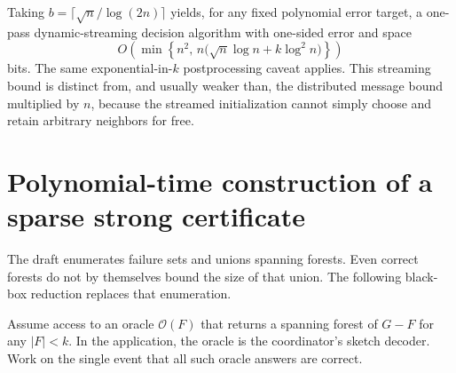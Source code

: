 \documentclass[11pt]{article}
\theoremstyle{remark}\newtheorem{remark}[theorem]{Remark}
\begin{document}
Taking $b=\lceil\sqrt n/\log(2n)\rceil$ yields, for any fixed polynomial error target, a one-pass dynamic-streaming decision algorithm with one-sided error and space
\[
 O\!\left(\min\left\{n^2,\,
 n\bigl(\sqrt n\log n+k\log^2n\bigr)\right\}\right)
\]
bits. The same exponential-in-$k$ postprocessing caveat applies. This streaming bound is distinct from, and usually weaker than, the distributed message bound multiplied by $n$, because the streamed initialization cannot simply choose and retain arbitrary neighbors for free.

\section{Polynomial-time construction of a sparse strong certificate}
The draft enumerates failure sets and unions spanning forests. Even correct forests do not by themselves bound the size of that union. The following black-box reduction replaces that enumeration.

Assume access to an oracle $\mathcal O(F)$ that returns a spanning forest of $G-F$ for any $|F|<k$. In the application, the oracle is the coordinator's sketch decoder. Work on the single event that all such oracle answers are correct.
\end{document}
